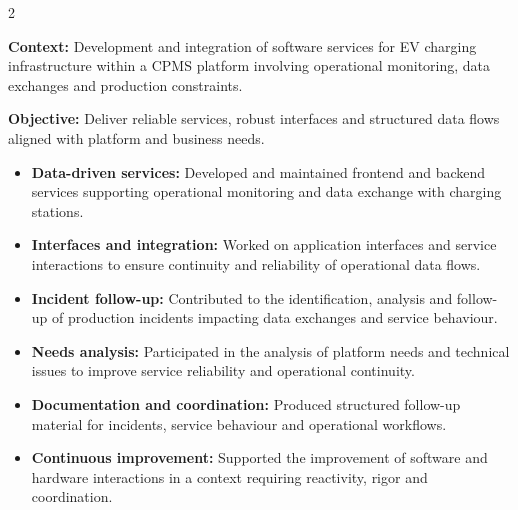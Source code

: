 \documentclass[8pt,a4paper,ragged2e,withhyper]{../_shared/altacv}
\begin{document}


\makecvheader

\vspace{-0.3cm}


\begin{paracol}{2}


\textbf{Context:} Development and integration of software services for EV charging infrastructure within a CPMS platform involving operational monitoring, data exchanges and production constraints.

\textbf{Objective:} Deliver reliable services, robust interfaces and structured data flows aligned with platform and business needs.

\begin{itemize}
\item \textbf{Data-driven services:} Developed and maintained frontend and backend services supporting operational monitoring and data exchange with charging stations.
\item \textbf{Interfaces and integration:} Worked on application interfaces and service interactions to ensure continuity and reliability of operational data flows.
\item \textbf{Incident follow-up:} Contributed to the identification, analysis and follow-up of production incidents impacting data exchanges and service behaviour.
\item \textbf{Needs analysis:} Participated in the analysis of platform needs and technical issues to improve service reliability and operational continuity.
\item \textbf{Documentation and coordination:} Produced structured follow-up material for incidents, service behaviour and operational workflows.
\item \textbf{Continuous improvement:} Supported the improvement of software and hardware interactions in a context requiring reactivity, rigor and coordination.
\end{itemize}


\end{paracol}
\end{document}
